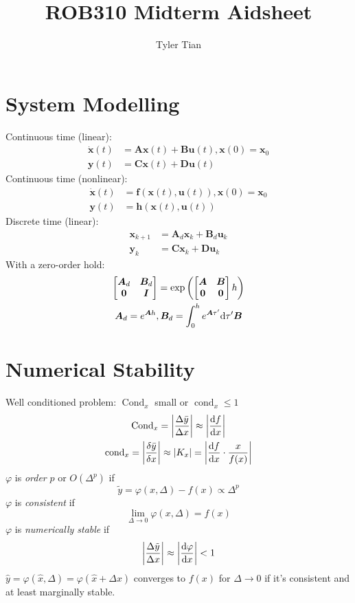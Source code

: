 \documentclass[twocolumn]{article}
\title{ROB310 Midterm Aidsheet}
\author{Tyler Tian}
\begin{document}
\setlength{\abovedisplayskip}{3pt}
\setlength{\belowdisplayskip}{3pt}
\setlength{\parindent}{0pt}

\section{System Modelling}

Continuous time (linear):
$$\begin{aligned} \dot{\bm x}(t) &= \bm A\bm x(t) + \bm B\bm u(t), \bm x(0) = \bm x_0 \\ \bm y(t) &= \bm C\bm x(t) + \bm D\bm u(t)\end{aligned}$$
Continuous time (nonlinear):
$$\begin{aligned}\dot{\bm x}(t) &= \bm f(\bm x(t), \bm u(t)), \bm x(0) = \bm x_0 \\ \bm y(t) &= \bm h(\bm x(t), \bm u(t))\end{aligned}$$
Discrete time (linear):
$$\begin{aligned}\bm x_{k + 1} &= \bm A_d\bm x_k + \bm B_d\bm u_k \\ \bm y_k &= \bm C\bm x_k + \bm D\bm u_k\end{aligned}$$
With a zero-order hold:
\begin{gather*}\mattwo{\bm A_d}{\bm B_d}{\bm 0}{\bm I} = \exp\left(\mattwo{\bm A}{\bm B}{\bm 0}{\bm 0}h\right) \\
\bm A_d = e^{\bm Ah}, \bm B_d = \int _0^h e^{\bm A\tau'}\dd\tau'\bm B\end{gather*}

\section{Numerical Stability}

Well conditioned problem: $\operatorname{Cond}_x$ small or $\operatorname{cond}_x \leq 1$
\begin{gather*}
    \operatorname{Cond}_x = \abs*{\frac{\Delta\bar y}{\Delta x}} \approx \abs*{\diff{f}{x}} \\
    \operatorname{cond}_x = \abs*{\frac{\delta\bar y}{\delta x}} \approx \abs{K_x} = \abs*{\diff{f}{x} \cdot \frac{x}{f(x)}}
\end{gather*}
$\varphi$ is \textit{order} $p$ or $O(\Delta^p)$ if
$$\tilde y = \varphi(x, \Delta) - f(x) \propto \Delta^p$$
$\varphi$ is \textit{consistent} if
$$\lim _{\Delta \to 0} \varphi(x, \Delta) = f(x)$$
$\varphi$ is \textit{numerically stable} if
$$\abs*{\frac{\Delta\tilde y}{\Delta x}} \approx \abs*{\diff{\varphi}{x}} < 1$$
$\hat y = \varphi(\hat x, \Delta) = \varphi(\hat x + \Delta x)$ converges to $f(x)$ for $\Delta \to 0$ if it's consistent and at least marginally stable.
\end{document}
